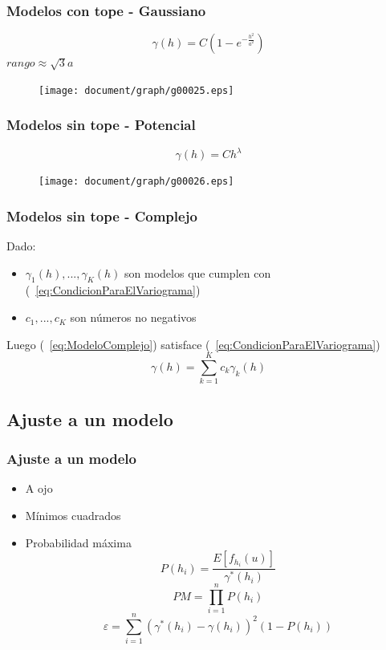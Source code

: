 \documentclass{beamer}
\begin{document}
\begin{frame}
\frametitle{Modelos con tope - Gaussiano}
\begin{equation}
\gamma(h) = C(1-e^{-\frac{h^2}{a^2}})
\end{equation}
$rango \approx \sqrt{3}a$
\begin{figure}
\texttt{[image: document/graph/g00025.eps]}
\end{figure}
\end{frame}

\begin{frame}
\frametitle{Modelos sin tope - Potencial}
\begin{equation}
\gamma(h) = C h^\lambda
\end{equation}
\begin{figure}
\texttt{[image: document/graph/g00026.eps]}
\end{figure}
\end{frame}

\begin{frame}
\frametitle{Modelos sin tope - Complejo}
Dado:
\begin{itemize}
\item $\gamma_1(h),...,\gamma_K(h)$ son modelos que cumplen con (~\ref{eq:CondicionParaElVariograma})
\item $c_1,...,c_K$ son números no negativos
\end{itemize}
Luego (~\ref{eq:ModeloComplejo}) satisface (~\ref{eq:CondicionParaElVariograma})
\begin{equation}
\gamma(h) = \sum_{k=1}^K c_k \gamma_k(h)
\label{eq:ModeloComplejo}
\end{equation}
\end{frame}


\subsection{Ajuste a un modelo}
\begin{frame}
\frametitle{Ajuste a un modelo}
\begin{itemize}
\item A ojo
\item Mínimos cuadrados
\item Probabilidad máxima
\begin{equation}
P(h_i) = \frac{E[f_{h_i}(u)]}{\gamma^*(h_i)}
\end{equation}
\begin{equation}
PM = \prod_{i=1}^n P(h_i)
\end{equation}
\begin{equation}
\varepsilon = \sum_{i=1}^n (\gamma^*(h_i) - \gamma(h_i))^2 (1 - P(h_i))
\end{equation}
\end{itemize}
\end{frame}
\end{document}
